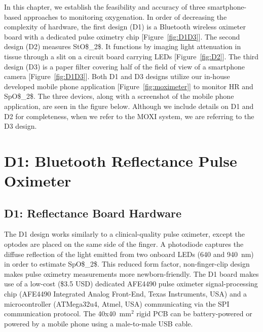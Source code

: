 In this chapter, we establish the feasibility and accuracy of three smartphone-based approaches to monitoring oxygenation. In order of decreasing the complexity of hardware, the first design (D1) is a Bluetooth wireless oximeter board with a dedicated pulse oximetry chip [Figure~\ref{fig:D1D3}]. The second design (D2) measures \ac{StO$_2$}. It functions by imaging light attenuation in tissue through a slit on a circuit board carrying \ac{LED}s [Figure~\ref{fig:D2}]. The third design (D3) is a paper filter covering half of the field of view of a smartphone camera [Figure~\ref{fig:D1D3}]. Both D1 and D3 designs utilize our in-house developed mobile phone application [Figure~\ref{fig:moximeter}] to monitor \ac{HR} and \ac{SpO$_2$}. The three devices, along with a screenshot of the mobile phone application, are seen in the figure below. Although we include details on D1 and D2 for completeness, when we refer to the \ac{MOXI} system, we are referring to the D3 design. 



\section{D1: Bluetooth Reflectance Pulse Oximeter}
\subsection{D1: Reflectance Board Hardware}
The D1 design works similarly to a clinical-quality pulse oximeter, except the optodes are placed on the same side of the finger. A photodiode captures the diffuse reflection of the light emitted from two onboard \ac{LED}s (640 and 940~nm) in order to estimate \ac{SpO$_2$}. This reduced form factor, non-finger-clip design makes pulse oximetry measurements more newborn-friendly. The D1 board makes use of a low-cost (\$3.5 USD) dedicated \ac{AFE4490} pulse oximeter signal-processing chip (AFE4490 Integrated Analog Front-End, Texas Instruments, USA) and a microcontroller (ATMega32u4, Atmel, USA) communicating via the \ac{SPI} communication protocol. The 40x40~mm$^2$ rigid \ac{PCB} can be battery-powered or powered by a mobile phone using a male-to-male USB cable. 
    
